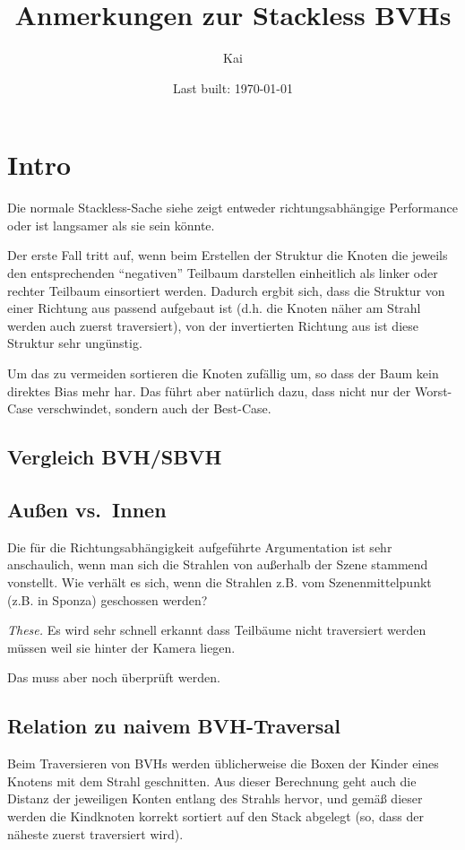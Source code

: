 \documentclass[a4paper,11pt]{article}
\title{Anmerkungen zur Stackless BVHs}
\author{Kai}
\date{Last built: \today}
\begin{document}
\maketitle\thispagestyle{empty}

\section{Intro}
Die normale Stackless-Sache siehe \citet{DAENEN} zeigt entweder richtungsabhängige Performance oder ist langsamer als sie sein könnte.

Der erste Fall tritt auf, wenn beim Erstellen der Struktur die Knoten die jeweils den entsprechenden ``negativen'' Teilbaum darstellen einheitlich als linker oder rechter Teilbaum einsortiert werden.
Dadurch ergbit sich, dass die Struktur von einer Richtung aus passend aufgebaut ist (d.h. die Knoten näher am Strahl werden auch zuerst traversiert), von der invertierten Richtung aus ist diese Struktur sehr ungünstig.

Um das zu vermeiden sortieren \citet{DAENEN} die Knoten zufällig um, so dass der Baum kein direktes Bias mehr har.
Das führt aber natürlich dazu, dass nicht nur der Worst-Case verschwindet, sondern auch der Best-Case.

\subsection{Vergleich BVH/SBVH}

\subsection{Außen vs.\ Innen}
Die für die Richtungsabhängigkeit aufgeführte Argumentation ist sehr anschaulich, wenn man sich die Strahlen von außerhalb der Szene stammend vonstellt.
Wie verhält es sich, wenn die Strahlen z.B. vom Szenenmittelpunkt (z.B. in Sponza) geschossen werden?

\emph{These.} Es wird sehr schnell erkannt dass Teilbäume nicht traversiert werden müssen weil sie hinter der Kamera liegen.

Das muss aber noch überprüft werden.


\subsection{Relation zu naivem BVH-Traversal}
Beim Traversieren von BVHs werden üblicherweise die Boxen der Kinder eines Knotens mit dem Strahl geschnitten.
Aus dieser Berechnung geht auch die Distanz der jeweiligen Konten entlang des Strahls hervor, und gemäß dieser werden die Kindknoten korrekt sortiert auf den Stack abgelegt (so, dass der näheste zuerst traversiert wird).
\end{document}
